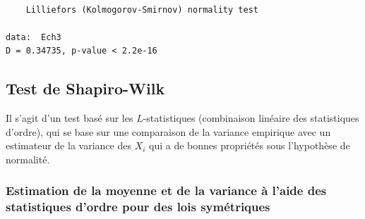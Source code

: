 \documentclass[
]{book}
\theoremstyle{definition}
\theoremstyle{definition}
\theoremstyle{definition}
\theoremstyle{definition}
\theoremstyle{remark}
\begin{document}
\begin{verbatim}

    Lilliefors (Kolmogorov-Smirnov) normality test

data:  Ech3
D = 0.34735, p-value < 2.2e-16
\end{verbatim}

\hypertarget{test-de-shapiro-wilk}{%
\subsection{Test de Shapiro-Wilk}\label{test-de-shapiro-wilk}}

Il s'agit d'un test basé sur les \(L\)-statistiques (combinaison linéaire des statistiques d'ordre), qui se base sur une comparaison de la variance empirique avec un estimateur de la variance des \(X_i\) qui a de bonnes propriétés sous l'hypothèse de normalité.

\hypertarget{estimation-de-la-moyenne-et-de-la-variance-uxe0-laide-des-statistiques-dordre-pour-des-lois-symuxe9triques}{%
\subsubsection{Estimation de la moyenne et de la variance à l'aide des statistiques d'ordre pour des lois symétriques}\label{estimation-de-la-moyenne-et-de-la-variance-uxe0-laide-des-statistiques-dordre-pour-des-lois-symuxe9triques}}
\end{document}
